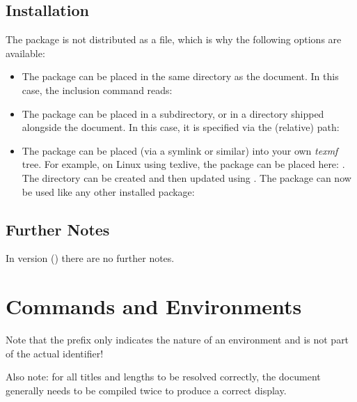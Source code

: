 \documentclass{sopra-base}
\begin{document}
\subsection{Installation}
    The package is not distributed as a  file, which is why the
    following options are available:
    \begin{itemize}
        \item The package can be placed in the same directory as the document.
                In this case, the inclusion command reads:
\begin{plainlatex}
\usepackage{sopra-ntts}
\end{plainlatex}
        \item The package can be placed in a subdirectory, or in a
                directory shipped alongside the document. In
                this case, it is specified via the (relative) path:
\begin{plainlatex}
\usepackage{./My/Path/to/sopra-ntts}
\end{plainlatex}
        \item The package can be placed (via a symlink or similar)
              into your own \emph{texmf} tree.
              For example, on Linux using texlive,
              the package can be placed here: .
              The directory can be created and then
              updated using . The
              package can now be used like any other installed package:
\begin{plainlatex}
\usepackage{sopra-ntts}
\end{plainlatex}
    \end{itemize}

\subsection{Further Notes}
In version \thesonversion{} () there are no further
notes.

\section{Commands and Environments}

Note that the prefix  only indicates the nature of an environment and is not part of the actual identifier!\par{}
Also note: for all titles and lengths to be resolved correctly, the document
generally needs to be compiled twice to produce a correct display.
\end{document}
